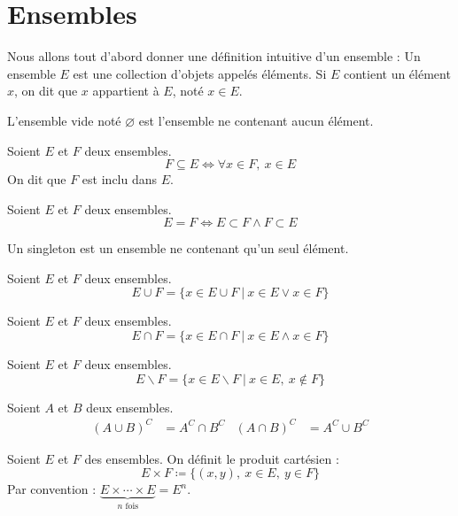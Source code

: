 \chapter{Ensembles}
\def\arraystretch{1}

Nous allons tout d'abord donner une définition intuitive d'un ensemble : Un ensemble $E$ est une collection d'objets appelés éléments. Si $E$ contient un élément $x$, on dit que $x$ appartient à $E$, noté $x \in E$.

\begin{definition}
  L'ensemble vide noté $\varnothing$ est l'ensemble ne contenant aucun élément.
\end{definition}

\begin{definition}[Inclusion]
  Soient $E$ et $F$ deux ensembles.
  $$F \subseteq E \iff \forall x \in F,\ x \in E$$
  On dit que $F$ est inclu dans $E$.
\end{definition}

\begin{definition}
  Soient $E$ et $F$ deux ensembles.
  $$E = F \iff E \subset F \land F \subset E$$
\end{definition}

\begin{definition}[Singleton]
  Un singleton est un ensemble ne contenant qu'un seul élément.
\end{definition}

\begin{definition}
  Soient $E$ et $F$ deux ensembles.
  \[ E \cup F = \{ x \in E \cup F \ | \ x \in E \lor x \in F \} \]
\end{definition}

\begin{definition}
  Soient $E$ et $F$ deux ensembles.
  \[ E \cap F = \{ x \in E \cap F \ | \ x \in E \land x \in F \} \]
\end{definition}

\begin{definition}
  Soient $E$ et $F$ deux ensembles.
  \[ E \backslash F = \{ x \in E \backslash F \ | \ x \in E,\ x \notin F \} \]
\end{definition}

\begin{proposition}
  Soient $A$ et $B$ deux ensembles.
  \begin{align*}
    (A \cup B)^{C} &= A^{C} \cap B^{C} & (A \cap B)^{C} &= A^{C} \cup B^{C}
  \end{align*}
\end{proposition}

\begin{definition}
    Soient $E$ et $F$ des ensembles. On définit le produit cartésien :
    \[ E \times F \coloneqq \{ (x, y),\ x \in E,\ y \in F \} \]
    Par convention : $\underbrace{E \times \cdots \times E}_{n \text{ fois}} = E^n$.
\end{definition}
